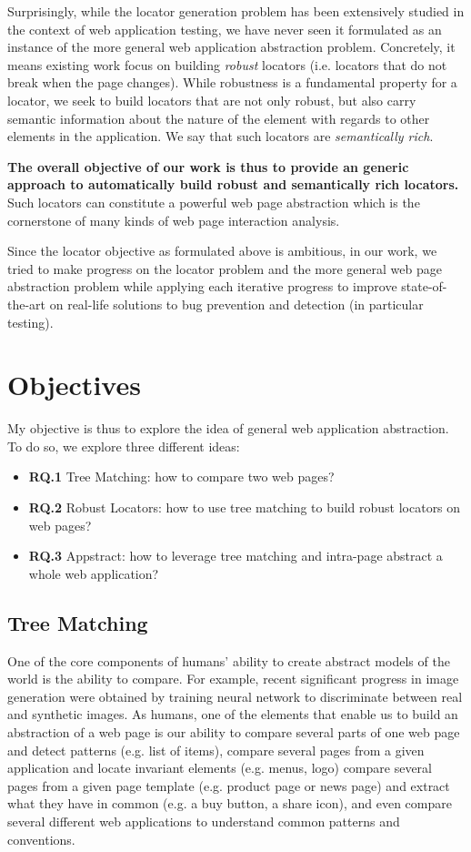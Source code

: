 Surprisingly, while the locator generation problem has been extensively studied in the context of web application testing, we have never seen it formulated as an instance of the more general web application abstraction problem.
Concretely, it means existing work focus on building \textit{robust} locators (i.e. locators that do not break when the page changes). While robustness is a fundamental property for a locator, we seek to build locators that are not only robust, but also carry semantic information about the nature of the element with regards to other elements in the application. We say that such locators are \textit{semantically rich}. 

\textbf{The overall objective of our work is thus to provide an generic approach to automatically build robust and semantically rich locators.}
Such locators can constitute a powerful web page abstraction which is the cornerstone of many kinds of web page interaction analysis.

Since the locator objective as formulated above is ambitious, in our work, we tried to make progress on the locator problem and the more general web page abstraction problem while applying each iterative progress to improve state-of-the-art on real-life solutions to bug prevention and detection (in particular testing).

\section{Objectives}
My objective is thus to explore the idea of general web application abstraction. To do so, we explore three different ideas:
\begin{itemize}[label={}]
\item \textbf{RQ.1 } Tree Matching: how to compare two web pages?
\item \textbf{RQ.2 } Robust Locators: how to use tree matching to build robust locators on web pages?
\item \textbf{RQ.3 } Appstract: how to leverage tree matching and intra-page abstract a whole web application?
\end{itemize}

\subsection{Tree Matching}
One of the core components of humans' ability to create abstract models of the world is the ability to compare.
For example, recent significant progress in image generation were obtained by training neural network to discriminate between real and synthetic images. As humans, one of the elements that enable us to build an abstraction of a web page is our ability 
to compare several parts of one web page and detect patterns (e.g. list of items), 
compare several pages from a given application and locate invariant elements (e.g. menus, logo)
compare several pages from a given page template (e.g. product page or news page) and extract what they have in common (e.g. a buy button, a share icon),
and even compare several different web applications to understand common patterns and conventions.

